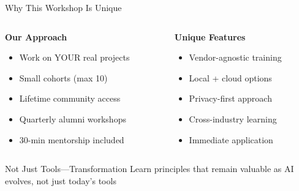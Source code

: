 \documentclass{beamer}
\begin{document}
\begin{frame}{Why This Workshop Is Unique}
\begin{columns}[T]
\begin{column}{0.5\textwidth}
\textbf{Our Approach}
\begin{itemize}
\item Work on YOUR real projects
\item Small cohorts (max 10)
\item Lifetime community access
\item Quarterly alumni workshops
\item 30-min mentorship included
\end{itemize}
\end{column}
\begin{column}{0.5\textwidth}
\textbf{Unique Features}
\begin{itemize}
\item Vendor-agnostic training
\item Local + cloud options
\item Privacy-first approach
\item Cross-industry learning
\item Immediate application
\end{itemize}
\end{column}
\end{columns}
\vspace{1em}
\begin{block}{Not Just Tools—Transformation}
Learn principles that remain valuable as AI evolves, not just today's tools
\end{block}
\end{frame}
\end{document}
